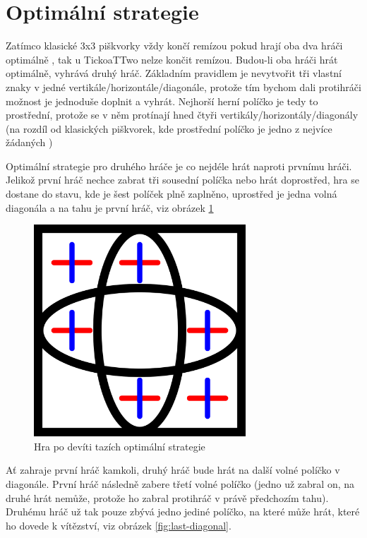 
\section{Optimální strategie}
Zatímco klasické 3x3 piškvorky vždy končí remízou pokud hrají oba dva hráči optimálně
\cite{crowley1993}, tak u TickoaTTwo nelze končit remízou. Budou-li oba hráči hrát
optimálně, vyhrává druhý hráč. Základním pravidlem je nevytvořit tři vlastní
znaky v jedné vertikále/horizontále/diagonále, protože tím bychom dali
protihráči možnost je jednoduše doplnit a vyhrát. Nejhorší herní políčko je
tedy to prostřední, protože se v něm protínají hned čtyři
vertikály/horizontály/diagonály (na rozdíl od klasických piškvorek, kde
prostřední políčko je jedno z nejvíce žádaných \cite{xkcd832})

Optimální strategie pro druhého hráče je co nejdéle hrát naproti prvnímu hráči.
Jelikož první hráč nechce zabrat tři sousední políčka nebo hrát doprostřed, hra
se dostane do stavu, kde je šest políček plně zaplněno, uprostřed je jedna
volná diagonála a na tahu je první hráč, viz obrázek \ref{fig:empty-diagonal}

\begin{figure}[h]
    \centering
    \includegraphics[width=300px]{img/empty-diagonal.png}
    \caption{Hra po devíti tazích optimální strategie}
    \label{fig:empty-diagonal}
\end{figure}

Ať zahraje první hráč kamkoli, druhý hráč bude hrát na další volné políčko v
diagonále. První hráč následně zabere třetí volné políčko (jedno už zabral on,
na druhé hrát nemůže, protože ho zabral protihráč v právě předchozím tahu).
Druhému hráč už tak pouze zbývá jedno jediné políčko, na které může hrát, které
ho dovede k vítězství, viz obrázek \ref{fig:last-diagonal}.

